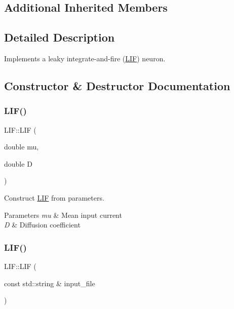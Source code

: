 \subsection*{Additional Inherited Members}


\subsection{Detailed Description}
Implements a leaky integrate-\/and-\/fire (\hyperlink{classLIF}{L\+IF}) neuron. 

\subsection{Constructor \& Destructor Documentation}
\mbox{\label{classLIF_a368895a753990fa32eb317fde0e9eac5}} 
\subsubsection{\texorpdfstring{L\+I\+F()}{LIF()}\hspace{0.1cm}{\footnotesize\ttfamily [1/2]}}
{\footnotesize\ttfamily L\+I\+F\+::\+L\+IF (\begin{DoxyParamCaption}\item[{double}]{mu,  }\item[{double}]{D }\end{DoxyParamCaption})}



Construct \hyperlink{classLIF}{L\+IF} from parameters. 


\begin{DoxyParams}{Parameters}
{\em mu} & Mean input current \\
\hline
{\em D} & Diffusion coefficient \\
\hline
\end{DoxyParams}
\mbox{\label{classLIF_a1fcddc7f8aa88974ef0143af4469b547}} 
\subsubsection{\texorpdfstring{L\+I\+F()}{LIF()}\hspace{0.1cm}{\footnotesize\ttfamily [2/2]}}
{\footnotesize\ttfamily L\+I\+F\+::\+L\+IF (\begin{DoxyParamCaption}\item[{const std\+::string \&}]{input\+\_\+file }\end{DoxyParamCaption})}



